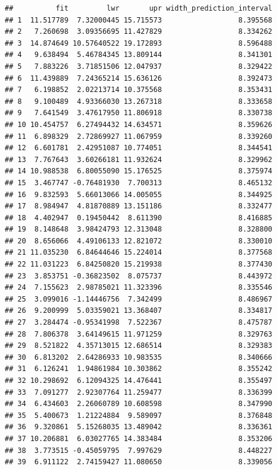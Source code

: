 \documentclass[
]{book}
\begin{document}
\begin{verbatim}
##          fit         lwr       upr width_prediction_interval
## 1  11.517789  7.32000445 15.715573                  8.395568
## 2   7.260698  3.09356695 11.427829                  8.334262
## 3  14.874649 10.57640522 19.172893                  8.596488
## 4   9.638494  5.46784345 13.809144                  8.341301
## 5   7.883226  3.71851506 12.047937                  8.329422
## 6  11.439889  7.24365214 15.636126                  8.392473
## 7   6.198852  2.02213714 10.375568                  8.353431
## 8   9.100489  4.93366030 13.267318                  8.333658
## 9   7.641549  3.47617950 11.806918                  8.330738
## 10 10.454757  6.27494432 14.634571                  8.359626
## 11  6.898329  2.72869927 11.067959                  8.339260
## 12  6.601781  2.42951087 10.774051                  8.344541
## 13  7.767643  3.60266181 11.932624                  8.329962
## 14 10.988538  6.80055090 15.176525                  8.375974
## 15  3.467747 -0.76481930  7.700313                  8.465132
## 16  9.832593  5.66013066 14.005055                  8.344925
## 17  8.984947  4.81870889 13.151186                  8.332477
## 18  4.402947  0.19450442  8.611390                  8.416885
## 19  8.148648  3.98424793 12.313048                  8.328800
## 20  8.656066  4.49106133 12.821072                  8.330010
## 21 11.035230  6.84644646 15.224014                  8.377568
## 22 11.031223  6.84250820 15.219938                  8.377430
## 23  3.853751 -0.36823502  8.075737                  8.443972
## 24  7.155623  2.98785021 11.323396                  8.335546
## 25  3.099016 -1.14446756  7.342499                  8.486967
## 26  9.200999  5.03359021 13.368407                  8.334817
## 27  3.284474 -0.95341998  7.522367                  8.475787
## 28  7.806378  3.64149615 11.971259                  8.329763
## 29  8.521822  4.35713015 12.686514                  8.329383
## 30  6.813202  2.64286933 10.983535                  8.340666
## 31  6.126241  1.94861984 10.303862                  8.355242
## 32 10.298692  6.12094325 14.476441                  8.355497
## 33  7.091277  2.92307764 11.259477                  8.336399
## 34  6.434603  2.26060789 10.608598                  8.347990
## 35  5.400673  1.21224884  9.589097                  8.376848
## 36  9.320861  5.15268035 13.489042                  8.336361
## 37 10.206881  6.03027765 14.383484                  8.353206
## 38  3.773515 -0.45059795  7.997629                  8.448227
## 39  6.911122  2.74159427 11.080650                  8.339056

\end{verbatim}
\end{document}
